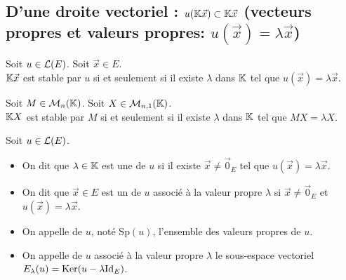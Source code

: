 \documentclass[a4paper]{book}
\begin{document}
\subsection{D'une droite vectoriel : $u(\mathbb{K} \vec{x})\subset \mathbb{K} \vec{x}$ (vecteurs propres et valeurs propres: $u(\vec{x})=\lambda \vec{x}$)}
\begin{Proposition}[Caractérisation] Soit $u\in \mathcal{L}(E)$. Soit $\vec{x}\in E$.\\
$\mathbb{K} \vec{x}$ est stable par $u$ si et seulement si il existe $\lambda$ dans $\mathbb{K} $ tel que $u(\vec{x})=\lambda \vec{x}$.
\end{Proposition}
\begin{Proposition}[Caractérisation] Soit $M\in \mathcal{M}_{n}(\mathbb{K})$. Soit $X\in\mathcal{M}_{n,1}(\mathbb{K})$.\\
 $\mathbb{K} X$ est stable par $M$ si et seulement si il existe $\lambda$ dans $\mathbb{K} $ tel que $MX=\lambda X$.
\end{Proposition}
\begin{Definition}
Soit $u\in \mathcal{L}(E)$.
\begin{itemize}
\item On dit que $\lambda    \in \mathbb{K} $ est une  de $u$ si  il existe $\vec{x}\neq \vec{0}_{E}$ tel que $u(\vec{x}) =\lambda    \vec{x}$.
\item On dit que $\vec{x}\in E$ est un  de $u$ associé à la valeur propre $\lambda    $ si  $\vec{x}\neq \vec{0}_{E}$ et $u(\vec{x}) =\lambda    \vec{x}$.
\item On appelle  de $u$, noté $\mathrm{Sp}(u)$, l'ensemble des valeurs propres de $u$.
\item On appelle  de $u$ associé à la valeur propre $\lambda    $ le sous-espace vectoriel $E_\lambda    (u) = \operatorname{Ker}(u -\lambda    \mathrm{Id}_E)$.
\end{itemize}
\end{Definition}
\end{document}
